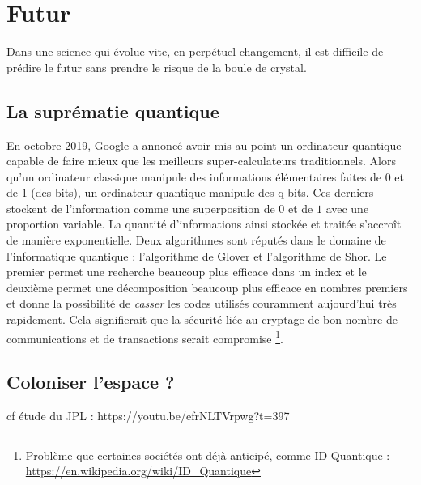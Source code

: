 \documentclass[a4paper,11pt]{book}
\begin{document}
\section{Futur}
Dans une science qui évolue vite, en perpétuel changement, il est difficile de prédire le futur sans prendre le risque de la boule de crystal. 
\subsection{La suprématie quantique}
En octobre 2019, Google a annoncé avoir mis au point un ordinateur quantique capable de faire mieux que les meilleurs super-calculateurs \guillemotleft traditionnels\guillemotright. Alors qu'un ordinateur classique manipule des informations élémentaires faites de $0$ et de $1$ (des bits), un ordinateur quantique manipule des q-bits. Ces derniers stockent de l'information comme une superposition de $0$ et de $1$ avec une proportion variable. La quantité d'informations ainsi stockée et traitée s'accroît de manière exponentielle. Deux algorithmes sont réputés dans le domaine de l'informatique quantique : l'algorithme de Glover et l'algorithme de Shor. Le premier permet une recherche beaucoup plus efficace dans un index et le deuxième permet une décomposition beaucoup plus efficace en nombres premiers et donne la possibilité de \textit{casser} les codes utilisés couramment aujourd'hui très rapidement. Cela signifierait que la sécurité liée au cryptage de bon nombre de communications et de transactions serait compromise \footnote{Problème que certaines sociétés ont déjà anticipé, comme ID Quantique : \url{https://en.wikipedia.org/wiki/ID_Quantique}}.

\subsection{Coloniser l'espace ?}
cf étude du JPL :
https://youtu.be/efrNLTVrpwg?t=397
\end{document}
